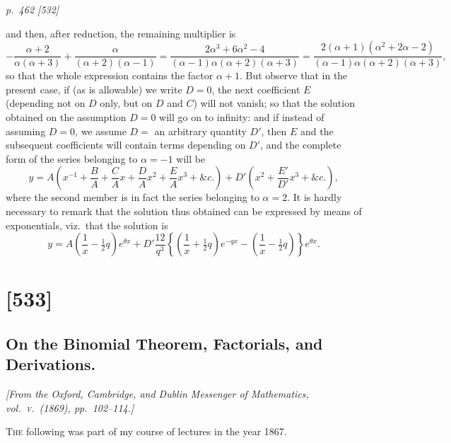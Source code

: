 \documentclass[11pt,a4paper]{article}
\theoremstyle{plain}
\theoremstyle{definition}
\begin{document}
\clearpage

\bigskip
\textit{p.~462 [532]}
\smallskip

and then, after reduction, the remaining multiplier is
\[
-\frac{\alpha+2}{\alpha(\alpha+3)}
+\frac{\alpha}{(\alpha+2)(\alpha-1)}
=\frac{2\alpha^3+6\alpha^2-4}{(\alpha-1)\alpha(\alpha+2)(\alpha+3)}
=\frac{2(\alpha+1)(\alpha^2+2\alpha-2)}{(\alpha-1)\alpha(\alpha+2)(\alpha+3)},
\]
so that the whole expression contains the factor $\alpha + 1$. But observe that in the
present case, if (as is allowable) we write $D=0$, the next coefficient $E$ (depending
not on $D$ only, but on $D$ and $C$) will not vanish; so that the solution obtained on
the assumption $D=0$ will go on to infinity: and if instead of assuming $D=0$, we
assume $D=$ an arbitrary quantity $D'$, then $E$ and the subsequent coefficients will
contain terms depending on $D'$, and the complete form of the series belonging to
$\alpha = -1$ will be
\[
y=A\left(x^{-1}+\frac BA+\frac CAx+\frac DAx^2+\frac EAx^3+\&c.\right)
+D'\left(x^2+\frac{E'}{D'}x^3+\&c.\right),
\]
where the second member is in fact the series belonging to $\alpha=2$. It is hardly
necessary to remark that the solution thus obtained can be expressed by means of
exponentials, viz.\ that the solution is
\[
y=A\left(\frac1x-\tfrac12q\right)e^{\theta x}
+D'\frac{12}{q^3}
\left\{\left(\frac1x+\tfrac12q\right)e^{-qx}
-\left(\frac1x-\tfrac12q\right)\right\}e^{\theta x}.
\]

\clearpage

\section{[533]}
\subsection{On the Binomial Theorem, Factorials, and Derivations.}

\begin{center}
\textit{[From the Oxford, Cambridge, and Dublin Messenger of Mathematics, vol.~\textsc{v}.\ (1869), pp.~102--114.]}
\end{center}

\textsc{The} following was part of my course of lectures in the year 1867.
\end{document}
